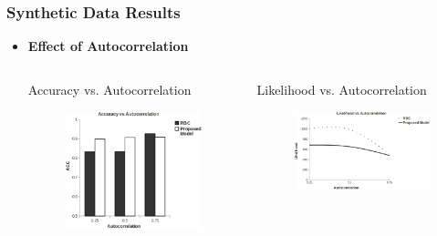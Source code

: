 \documentclass[10pt, blue,subsection=true, compress]{beamer}
\begin{document}
\begin{frame}\frametitle{Synthetic Data Results}
\begin{itemize}
\item \textbf{Effect of Autocorrelation}
\begin{columns}[t]

\begin{block}{Accuracy vs. Autocorrelation}
\begin{figure}[htbp]
\centering
\includegraphics[scale=0.25]{img/acc-ac.eps}
\end{figure}
\end{block}


\begin{block}{Likelihood vs. Autocorrelation}
\begin{figure}[htbp]
\centering
\includegraphics[scale=0.25]{img/lh-ac.eps}
\end{figure}


\end{block}
\end{columns}
\end{itemize}
\end{frame}
\end{document}
